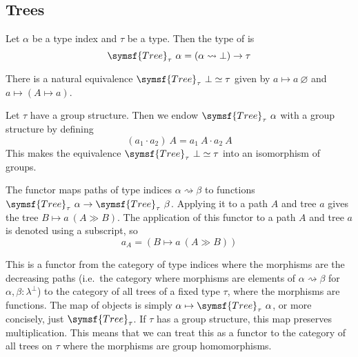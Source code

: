 \subsection{Trees}

\begin{definition}
    Let \( \alpha \) be a type index and \( \tau \) be a type.
    Then the type of  is
    \[ \symsf{Tree}_\tau\ \alpha = (\alpha \rightsquigarrow \bot) \to \tau \]
\end{definition}
\begin{definition}
    \label{def:tree_ofBot}
    There is a natural equivalence \( \symsf{Tree}_\tau\ \bot \simeq \tau \) given by \( a \mapsto a\ \varnothing \) and \( a \mapsto (A \mapsto a) \).
\end{definition}
\begin{definition}
    Let \( \tau \) have a group structure.
    Then we endow \( \symsf{Tree}_\tau\ \alpha \) with a group structure by defining
    \[ (a_1 \cdot a_2)\ A = a_1\ A \cdot a_2\ A \]
    This makes the equivalence \( \symsf{Tree}_\tau\ \bot \simeq \tau \) into an isomorphism of groups.
\end{definition}
\begin{definition}
    \label{def:derivative}
    The  functor maps paths of type indices \( \alpha \rightsquigarrow \beta \) to functions \( \symsf{Tree}_\tau\ \alpha \to \symsf{Tree}_\tau\ \beta \).
    Applying it to a path \( A \) and tree \( a \) gives the tree \( B \mapsto a\ (A \gg B) \).
    The application of this functor to a path \( A \) and tree \( a \) is denoted using a subscript, so
    \[ a_A = (B \mapsto a\ (A \gg B)) \]
\end{definition}
\begin{remark}
    This is a functor from the category of type indices where the morphisms are the decreasing paths (i.e.\ the category where morphisms are elements of \( \alpha \rightsquigarrow \beta \) for \( \alpha, \beta : \lambda^\bot \)) to the category of all trees of a fixed type \( \tau \), where the morphisms are functions.
    The map of objects is simply \( \alpha \mapsto \symsf{Tree}_\tau\ \alpha \), or more concisely, just \( \symsf{Tree}_\tau \).
    If \( \tau \) has a group structure, this map preserves multiplication.
    This means that we can treat this as a functor to the category of all trees on \( \tau \) where the morphisms are group homomorphisms.
\end{remark}
